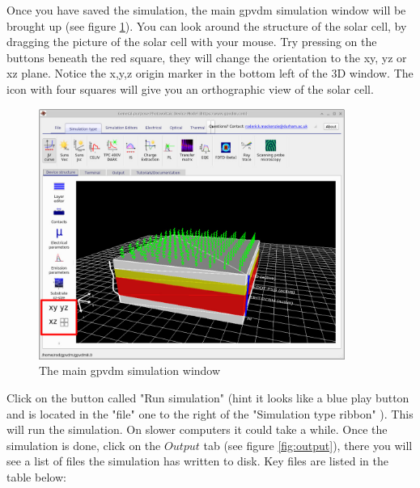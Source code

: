 Once you have saved the simulation, the main gpvdm simulation window will be brought up (see figure \ref{fig:simple_interface}). You can look around the structure of the solar cell, by dragging the picture of the solar cell with your mouse.  Try pressing on the buttons beneath the red square, they will change the orientation to the xy, yz or xz plane. Notice the x,y,z origin marker in the bottom left of the 3D window.  The icon with four squares will give you an orthographic view of the solar cell.


\begin{figure}[H]
\centering
\includegraphics[width=100mm]{./images/simple_interface.png}
\caption{The main gpvdm simulation window}
\label{fig:simple_interface}
\end{figure}

Click on the button called "Run simulation" (hint it looks like a blue play button and is located in the "file" one to the right of the "Simulation type ribbon" ).  This will run the simulation.  On slower computers it could take a while. Once the simulation is done, click on the $Output$ tab (see figure \ref{fig:output}), there you will see a list of files the simulation has written to disk. Key files are listed in the table below:

